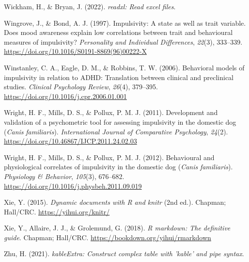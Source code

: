 \documentclass[
  ,pub,floatsintext]{apa6}
\newlength{\cslhangindent}
\newlength{\cslentryspacingunit} %
\newenvironment{CSLReferences}[2] %
 {%
  \setlength{\parindent}{0pt}
  \ifodd #1
  \let\oldpar\par
  \def\par{\hangindent=\cslhangindent\oldpar}
  \fi
  \setlength{\parskip}{#2\cslentryspacingunit}
 }%
 {}
\begin{document}
\begin{CSLReferences}{1}{0}
\leavevmode{}%
Wickham, H., \& Bryan, J. (2022). \emph{{readxl}: Read excel files}.

\leavevmode{}%
Wingrove, J., \& Bond, A. J. (1997). Impulsivity: {A} state as well as trait variable. {Does} mood awareness explain low correlations between trait and behavioural measures of impulsivity? \emph{Personality and Individual Differences}, \emph{22}(3), 333--339. \url{https://doi.org/10.1016/S0191-8869(96)00222-X}

\leavevmode{}%
Winstanley, C. A., Eagle, D. M., \& Robbins, T. W. (2006). Behavioral models of impulsivity in relation to {ADHD}: Translation between clinical and preclinical studies. \emph{Clinical Psychology Review}, \emph{26}(4), 379--395. \url{https://doi.org/10.1016/j.cpr.2006.01.001}

\leavevmode{}%
Wright, H. F., Mills, D. S., \& Pollux, P. M. J. (2011). Development and validation of a psychometric tool for assessing impulsivity in the domestic dog ({\emph{Canis}}{ \emph{familiaris}}). \emph{International Journal of Comparative Psychology}, \emph{24}(2). \url{https://doi.org/10.46867/IJCP.2011.24.02.03}

\leavevmode{}%
Wright, H. F., Mills, D. S., \& Pollux, P. M. J. (2012). Behavioural and physiological correlates of impulsivity in the domestic dog ({\emph{Canis}}{ \emph{familiaris}}). \emph{Physiology \& Behavior}, \emph{105}(3), 676--682. \url{https://doi.org/10.1016/j.physbeh.2011.09.019}

\leavevmode{}%
Xie, Y. (2015). \emph{Dynamic documents with {R} and knitr} (2nd ed.). Chapman; Hall/CRC. \url{https://yihui.org/knitr/}

\leavevmode{}%
Xie, Y., Allaire, J. J., \& Grolemund, G. (2018). \emph{R markdown: The definitive guide}. Chapman; Hall/CRC. \url{https://bookdown.org/yihui/rmarkdown}

\leavevmode{}%
Zhu, H. (2021). \emph{kableExtra: Construct complex table with 'kable' and pipe syntax}.

\end{CSLReferences}
\end{document}
